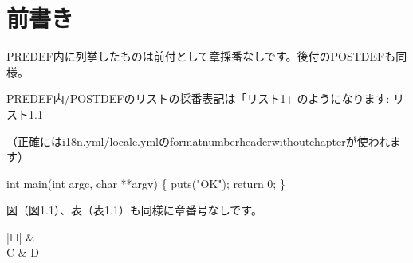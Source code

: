 \chapter{前書き}
\label{chap:pre01}

PREDEF内に列挙したものは前付として章採番なしです。後付のPOSTDEFも同様。

PREDEF内/POSTDEFのリストの採番表記は「リスト1」のようになります: リスト1.1

（正確にはi18n.yml/locale.ymlのformat\textunderscore{}number\textunderscore{}header\textunderscore{}without\textunderscore{}chapterが使われます）


\begin{reviewlistblock}
\begin{reviewemlist}
int
main(int argc, char **argv)
\{
    puts("OK");
    return 0;
\}
\end{reviewemlist}
\end{reviewlistblock}

図（図1.1）、表（表1.1）も同様に章番号なしです。

\begin{reviewimage}%
\label{image:pre01:fractal}
\end{reviewimage}

\begin{reviewtable}{|l|l|}
\hline
{} &  \\  \hline
C & D \\  \hline
\end{reviewtable}

